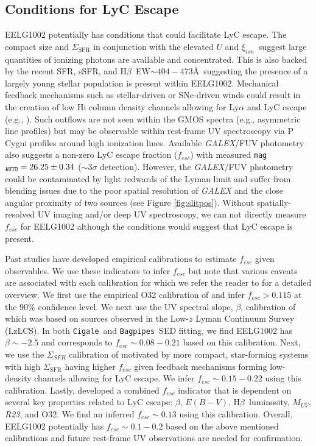 \documentclass[twocolumn,tight,times,linenumbers]{aastex631}
\newcommand{\hbeta}{H$\beta$}
\newcommand{\xiion}{$\xi_{ion}$}
\newcommand{\cigale}{\texttt{Cigale}}
\newcommand{\bagpipes}{\texttt{Bagpipes}}
\begin{document}
		\subsection{Conditions for LyC Escape}
		\label{sec:fesc}
		
		EELG1002 potentially has conditions that could facilitate LyC escape. The compact size and $\Sigma_\textrm{SFR}$ in conjunction with the elevated $U$ and \xiion~suggest large quantities of ionizing photons are available and concentrated. This is also backed by the recent SFR, sSFR, and \hbeta~EW$\sim 404 - 473$\AA~suggesting the presence of a largely young stellar population is present within EELG1002. Mechanical feedback mechanisms such as stellar-driven or SNe-driven winds could result in the creation of low H{\sc i} column density channels allowing for Ly$\alpha$ and LyC escape (e.g., \citealt{Yang2016,Pucha2022,Reddy2022}). Such outflows are not seen within the GMOS spectra (e.g., asymmetric line profiles) but may be observable within rest-frame UV spectroscopy via P Cygni profiles around high ionization lines. Available \textit{GALEX}/FUV photometry also suggests a non-zero LyC escape fraction ($f_{esc}$) with measured \texttt{mag}$_\textrm{\texttt{AUTO}} = 26.25\pm0.34$ ($\sim 3\sigma$ detection). However, the \textit{GALEX}/FUV photometry could be contaminated by light redwards of the Lyman limit and suffer from blending issues due to the poor spatial resolution of \textit{GALEX} and the close angular proximity of two sources (see Figure \ref{fig:slitpos}). Without spatially-resolved UV imaging and/or deep UV spectroscopy, we can not directly measure $f_{esc}$ for EELG1002 although the conditions would suggest that LyC escape is present.
		
		Past studies have developed empirical calibrations to estimate $f_{esc}$ given observables. We use these indicators to infer $f_{esc}$ but note that various caveats are associated with each calibration for which we refer the reader to \cite{Choustikov2024} for a detailed overview. We first use the empirical O32 calibration of \cite{Faisst2016_O32} and infer $f_{esc} > 0.115$ at the 90\% confidence level. We next use the UV spectral slope, $\beta$, calibration of \cite{Chisholm2022} which was based on sources observed in the Low-$z$ Lyman Continuum Survey (LzLCS). In both \cigale~and \bagpipes~SED fitting, we find EELG1002 has $\beta \sim -2.5$ and corresponds to $f_{esc} \sim 0.08 - 0.21$ based on this calibration. Next, we use the $\Sigma_{SFR}$ calibration of \cite{Naidu2020} motivated by more compact, star-forming systems with high $\Sigma_\textrm{SFR}$ having higher $f_{esc}$ given feedback mechanisms forming low-density channels allowing for LyC escape. We infer $f_{esc} \sim 0.15 - 0.22$ using this calibration. Lastly, \cite{Choustikov2024} developed a combined $f_{esc}$ indicator that is dependent on several key properties related to LyC escape: $\beta$, $E(B-V)$, \hbeta~luminosity, $M_{UV}$, \textit{R23}, and O32. We find an inferred $f_{esc} \sim 0.13$ using this calibration. Overall, EELG1002 potentially has $f_{esc} \sim 0.1 - 0.2$ based on the above mentioned calibrations and future rest-frame UV observations are needed for confirmation. 
\end{document}
